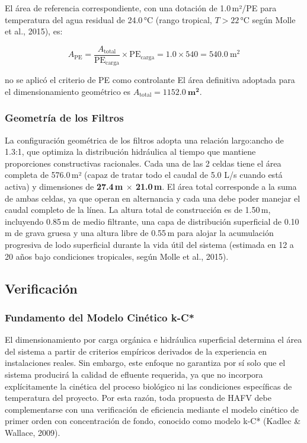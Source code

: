El área de referencia correspondiente, con una dotación de 1.0\,m²/PE para temperatura del agua residual de 24.0\,°C (rango tropical, $T > 22$\,°C según Molle et al., 2015), es:

\begin{equation}
A_\text{PE} = \frac{A_\text{total}}{\text{PE}_\text{carga}} \times \text{PE}_\text{carga} = 1.0 \times 540 = 540.0\ \text{m}^2
\end{equation}

no se aplicó el criterio de PE como controlante El área definitiva adoptada para el dimensionamiento geométrico es $A_\text{total} = \mathbf{1152.0\ \text{m}^2}$.

\subsubsection*{Geometría de los Filtros}

La configuración geométrica de los filtros adopta una relación largo:ancho de 1.3:1, que optimiza la distribución hidráulica al tiempo que mantiene proporciones constructivas racionales. Cada una de las 2 celdas tiene el área completa de 576.0\,m² (capaz de tratar todo el caudal de 5.0 L/s cuando está activa) y dimensiones de \textbf{27.4\,m $\times$ 21.0\,m}. El área total corresponde a la suma de ambas celdas, ya que operan en alternancia y cada una debe poder manejar el caudal completo de la línea. La altura total de construcción es de 1.50\,m, incluyendo 0.85\,m de medio filtrante, una capa de distribución superficial de 0.10\,m de grava gruesa y una altura libre de 0.55\,m para alojar la acumulación progresiva de lodo superficial durante la vida útil del sistema (estimada en 12 a 20 años bajo condiciones tropicales, según Molle et al., 2015).


\subsection{Verificación}

\subsubsection*{Fundamento del Modelo Cinético k-C*}

El dimensionamiento por carga orgánica e hidráulica superficial determina el área del sistema a partir de criterios empíricos derivados de la experiencia en instalaciones reales. Sin embargo, este enfoque no garantiza por sí solo que el sistema producirá la calidad de efluente requerida, ya que no incorpora explícitamente la cinética del proceso biológico ni las condiciones específicas de temperatura del proyecto. Por esta razón, toda propuesta de HAFV debe complementarse con una verificación de eficiencia mediante el modelo cinético de primer orden con concentración de fondo, conocido como modelo k-C* (Kadlec \& Wallace, 2009).

